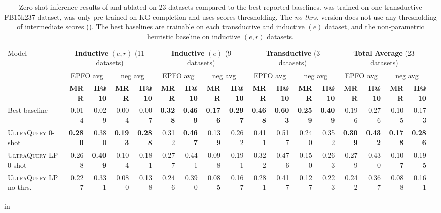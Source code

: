 \begin{table*}[t]
\centering
\caption{Zero-shot inference results of \method and ablated \methodlp on 23 datasets compared to the best reported baselines. \method was trained on one transductive FB15k237 dataset, \methodlp was only pre-trained on KG completion and uses scores thresholding. The \emph{no thrs.} version does not use any thresholding of intermediate scores (). The best baselines are trainable on each transductive and inductive $(e)$ dataset, and the non-parametric heuristic baseline on inductive $(e,r)$ datasets. }
\begin{adjustbox}{width=\textwidth}
\begin{tabular}{lrrrrrrrrrrrrrrrrr}\toprule
\multirow{3}{*}{Model} &\multicolumn{4}{c}{\textbf{Inductive} $(e,r)$ (11 datasets)} &\multicolumn{4}{c}{\textbf{Inductive} $(e)$ (9 datasets)} &\multicolumn{4}{c}{\textbf{Transductive} (3 datasets)} &\multicolumn{4}{c}{\textbf{Total Average} (23 datasets)} \\\cmidrule(l){2-5} \cmidrule(l){6-9} \cmidrule(l){10-13} \cmidrule(l){14-17}
&\multicolumn{2}{c}{EPFO avg} &\multicolumn{2}{c}{neg avg} &\multicolumn{2}{c}{EPFO avg} &\multicolumn{2}{c}{neg avg} &\multicolumn{2}{c}{EPFO avg} &\multicolumn{2}{c}{neg avg} &\multicolumn{2}{c}{EPFO avg} &\multicolumn{2}{c}{neg avg} \\\cmidrule(l){2-3} \cmidrule(l){4-5} \cmidrule(l){6-7} \cmidrule(l){8-9} \cmidrule(l){10-11} \cmidrule(l){12-13} \cmidrule(l){14-15} \cmidrule(l){16-17}
&\bf{MRR} &\bf{H@10} &\bf{MRR} &\bf{H@10} &\bf{MRR} &\bf{H@10} &\bf{MRR} &\bf{H@10} &\bf{MRR} &\bf{H@10} &\bf{MRR} &\bf{H@10} &\bf{MRR} &\bf{H@10} &\bf{MRR} &\bf{H@10} \\\midrule
Best baseline &0.014 &0.029 &0.004 &0.007 &\bf{0.328} &\textbf{0.469} &\bf{0.176} &\bf{0.297} &\bf{0.468} &\bf{0.603} &\bf{0.259} &\bf{0.409} &0.196 &0.276 &0.105 &0.173 \\ \midrule
\textsc{UltraQuery} 0-shot &\bf{0.280} &0.380 &\bf{0.193} &\bf{0.288} &0.312 &\bf{0.467} &0.139 &0.262 &0.411 &0.517 &0.240 &0.352 &\bf{0.309} &\bf{0.432} &\bf{0.178} &\bf{0.286} \\
\textsc{UltraQuery LP} 0-shot &0.268 &\bf{0.409} &0.104 &0.181 &0.277 &0.441 &0.098 &0.191 &0.322 &0.476 &0.150 &0.263 &0.279 &0.430 &0.107 &0.195 \\
\textsc{UltraQuery LP} no thrs. &0.227 &0.331 &0.080 &0.138 &0.246 &0.390 &0.085 &0.167 &0.281 &0.417 &0.127 &0.223 &0.242 &0.367 &0.088 &0.161 \\
\bottomrule
\end{tabular}
\end{adjustbox}
\label{tab:maintab1}
 in
\end{table*}